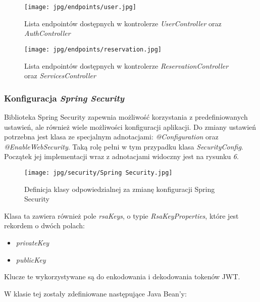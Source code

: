 \documentclass[11pt,a4paper]{article}
\begin{document}
\begin{figure}[H]
    \centering
    \texttt{[image: jpg/endpoints/user.jpg]}
    \caption{Lista endpointów dostępnych w kontrolerze \textsl{UserController} oraz \textsl{AuthController}}
\end{figure}

\begin{figure}[H]
    \centering
    \texttt{[image: jpg/endpoints/reservation.jpg]}
    \caption{Lista endpointów dostępnych w kontrolerze \textsl{ReservationController} oraz \textsl{ServicesController}}
\end{figure}


\subsubsection{Konfiguracja \textsl{Spring Security}}

Biblioteka Spring Security zapewnia możliwość korzystania z predefiniowanych ustawień, ale również wiele możliwości konfiguracji aplikacji. Do zmiany ustawień potrzebna jest klasa ze specjalnym adnotacjami: \textcolor{keywordColour}{\textsl{@Configuration}} oraz \textcolor{keywordColour}{\textsl{@EnableWebSecurity}}. Taką rolę pełni w tym przypadku klasa \textsl{SecurityConfig}. Początek jej implementacji wraz z adnotacjami widoczny jest na rysunku \textsl{6}.

\begin{figure}[H]
    \centering
    \texttt{[image: jpg/security/Spring Security.jpg]}
    \caption{Definicja klasy odpowiedzialnej za zmianę konfiguracji Spring Security}
\end{figure}

\noindent
Klasa ta zawiera również pole \textsl{rsaKeys}, o typie \textsl{RsaKeyProperties}, które jest rekordem o dwóch polach: 

\begin{itemize}
    \item \textsl{privateKey}
    \item \textsl{publicKey}
\end{itemize}

\noindent
Klucze te wykorzystywane są do enkodowania i dekodowania tokenów JWT.

\newpage
\noindent
W klasie tej zostały zdefiniowane następujące Java Bean'y:
\end{document}
